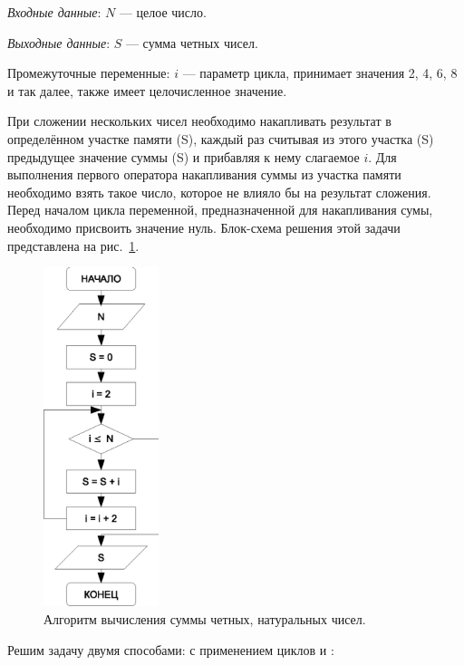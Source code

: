 
\emph{Входные данные}: $N$ --- целое число.

\emph{Выходные данные}: $S$ --- сумма четных чисел.

Промежуточные переменные: $i$ --- параметр цикла, принимает значения  2, 4, 6, 8 и так далее, также имеет
целочисленное значение.

При сложении нескольких чисел необходимо накапливать результат в определённом участке памяти (S), каждый раз считывая из
этого участка (S) предыдущее значение суммы (S) и прибавляя к нему слагаемое $i$. Для выполнения первого оператора
накапливания суммы из участка памяти необходимо взять такое число, которое не влияло бы на результат сложения. Перед
началом цикла переменной, предназначенной для накапливания сумы, необходимо присвоить значение нуль. Блок-схема решения
этой задачи представлена на рис.~\ref{ch03:refDrawing29}.

\begin{figure}[htb]
\begin{center}
\includegraphics[width=0.3\textwidth]{img/ris_3_30}
\caption{Алгоритм вычисления суммы четных, натуральных чисел.}
\label{ch03:refDrawing29}
\end{center}
\end{figure}

Решим задачу двумя способами: с применением циклов  и :

